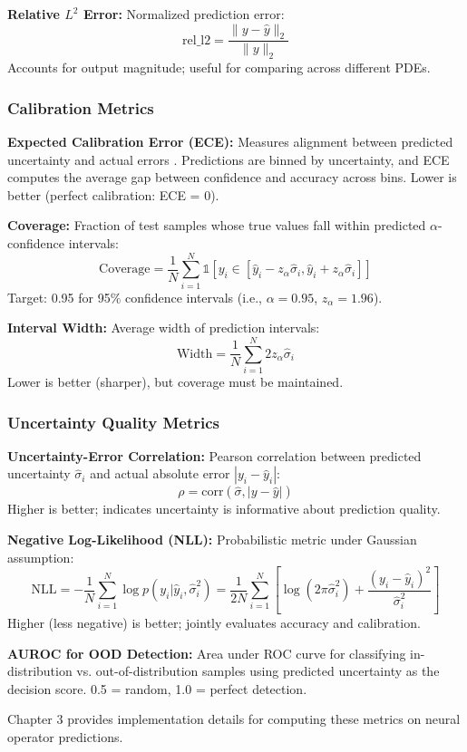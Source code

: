 \textbf{Relative $L^2$ Error:} Normalized prediction error:
\begin{equation}
    \text{rel\_l2} = \frac{\|y - \hat{y}\|_2}{\|y\|_2}
\end{equation}
Accounts for output magnitude; useful for comparing across different PDEs.

\subsubsection{Calibration Metrics}

\textbf{Expected Calibration Error (ECE):} Measures alignment between predicted uncertainty and actual errors \cite{guo2017calibration}. Predictions are binned by uncertainty, and ECE computes the average gap between confidence and accuracy across bins. Lower is better (perfect calibration: ECE = 0).

\textbf{Coverage:} Fraction of test samples whose true values fall within predicted $\alpha$-confidence intervals:
\begin{equation}
    \text{Coverage} = \frac{1}{N}\sum_{i=1}^{N} \mathbb{1}\left[y_i \in [\hat{y}_i - z_\alpha\hat{\sigma}_i, \hat{y}_i + z_\alpha\hat{\sigma}_i]\right]
\end{equation}
Target: 0.95 for 95\% confidence intervals (i.e., $\alpha = 0.95$, $z_\alpha = 1.96$).

\textbf{Interval Width:} Average width of prediction intervals:
\begin{equation}
    \text{Width} = \frac{1}{N}\sum_{i=1}^{N} 2z_\alpha\hat{\sigma}_i
\end{equation}
Lower is better (sharper), but coverage must be maintained.

\subsubsection{Uncertainty Quality Metrics}

\textbf{Uncertainty-Error Correlation:} Pearson correlation between predicted uncertainty $\hat{\sigma}_i$ and actual absolute error $|y_i - \hat{y}_i|$:
\begin{equation}
    \rho = \text{corr}(\hat{\sigma}, |y - \hat{y}|)
\end{equation}
Higher is better; indicates uncertainty is informative about prediction quality.

\textbf{Negative Log-Likelihood (NLL):} Probabilistic metric under Gaussian assumption:
\begin{equation}
    \text{NLL} = -\frac{1}{N}\sum_{i=1}^{N} \log p(y_i|\hat{y}_i, \hat{\sigma}_i^2) = \frac{1}{2N}\sum_{i=1}^{N} \left[\log(2\pi\hat{\sigma}_i^2) + \frac{(y_i - \hat{y}_i)^2}{\hat{\sigma}_i^2}\right]
\end{equation}
Higher (less negative) is better; jointly evaluates accuracy and calibration.

\textbf{AUROC for OOD Detection:} Area under ROC curve for classifying in-distribution vs. out-of-distribution samples using predicted uncertainty as the decision score. 0.5 = random, 1.0 = perfect detection.

Chapter 3 provides implementation details for computing these metrics on neural operator predictions.
